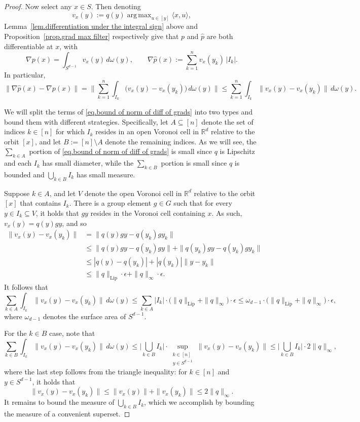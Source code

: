 \documentclass{article}
\theoremstyle{plain}
\theoremstyle{definition}
\DeclareMathOperator*{\argmax}{arg\,max}
\begin{document}
\begin{proof}
Now select any $x \in S$.
Then denoting 
\[
v_x(y)
:=q(y)\argmax_{u\in [y]}\langle x,u\rangle,
\]
Lemma~\ref{lem.differentiation under the integral sign} above and Proposition~\ref{prop.grad max filter} respectively give that $p$ and $\hat{p}$ are both differentiable at $x$, with
\[
\nabla p(x)
=\int_{S^{d-1}}v_x(y)\,d\omega(y),
\qquad
\nabla \hat{p}(x)
:=\sum_{k=1}^n v_x(y_k)\,|I_k|.
\]
In particular,
\begin{equation}
\label{eq.bound of norm of diff of grads}
\|\nabla\hat{p}(x)-\nabla p(x)\|
=\bigg\|\sum_{k=1}^n \int_{I_k} \big( v_x(y)-v_x(y_k)\big)\,d\omega(y)\bigg\|
\leq\sum_{k=1}^n \int_{I_k} \big\| v_x(y)-v_x(y_k)\big\|\,d\omega(y).
\end{equation}

We will split the terms of \eqref{eq.bound of norm of diff of grads} into two types and bound them with different strategies.
Specifically, let $A\subseteq[n]$ denote the set of indices $k\in[n]$ for which $I_k$ resides in an open Voronoi cell in $\mathbb{R}^d$ relative to the orbit $[x]$, and let $B:=[n]\setminus A$ denote the remaining indices.
As we will see, the $\sum_{k\in A}$ portion of \eqref{eq.bound of norm of diff of grads} is small since $q$ is Lipschitz and each $I_k$ has small diameter, while the $\sum_{k\in B}$ portion is small since $q$ is bounded and $\bigcup_{k\in B}I_k$ has small measure.

Suppose $k\in A$, and let $V$ denote the open Voronoi cell in $\mathbb{R}^d$ relative to the orbit $[x]$ that contains $I_k$.
There is a group element $g\in G$ such that for every $y\in I_k\subseteq V$, it holds that $gy$ resides in the Voronoi cell containing $x$.
As such, $v_x(y)=q(y)gy$, and so
\begin{align*}
\|v_x(y)-v_x(y_k)\|
&=\|q(y)gy-q(y_k)gy_k\|\\
&\leq\|q(y)gy-q(y_k)gy\|+\|q(y_k)gy-q(y_k)gy_k\|\\
&\leq |q(y)-q(y_k)|+|q(y_k)|\|y-y_k\|\\
&\leq \|q\|_{\operatorname{Lip}}\cdot\epsilon+\|q\|_{\infty}\cdot\epsilon.
\end{align*}
It follows that
\[
\sum_{k\in A} \int_{I_k} \big\| v_x(y)-v_x(y_k)\big\|\,d\omega(y)
\leq\sum_{k\in A} |I_k|\cdot\big(\|q\|_{\operatorname{Lip}}+\|q\|_{\infty}\big)\cdot\epsilon
\leq\omega_{d-1}\cdot \big(\|q\|_{\operatorname{Lip}}+\|q\|_{\infty}\big)\cdot\epsilon,
\]
where $\omega_{d-1}$ denotes the surface area of $S^{d-1}$.

For the $k\in B$ case, note that
\[
\sum_{k\in B} \int_{I_k} \big\| v_x(y)-v_x(y_k)\big\|\,d\omega(y)
\leq \bigg|\bigcup_{k\in B}I_k\bigg|\cdot\sup_{\substack{k\in [n]\\y\in S^{d-1}}}\|v_x(y)-v_x(y_k)\|
\leq \bigg|\bigcup_{k\in B}I_k\bigg|\cdot2\|q\|_\infty,
\]
where the last step follows from the triangle inequality:
for $k\in [n]$ and $y\in S^{d-1}$, it holds that
\[
\|v_x(y)-v_x(y_k)\|
\leq\|v_x(y)\|+\|v_x(y_k)\|
\leq2\|q\|_\infty.
\]
It remains to bound the measure of $\bigcup_{k\in B}I_k$, which we accomplish by bounding the measure of a convenient superset.


\end{proof}
\end{document}
